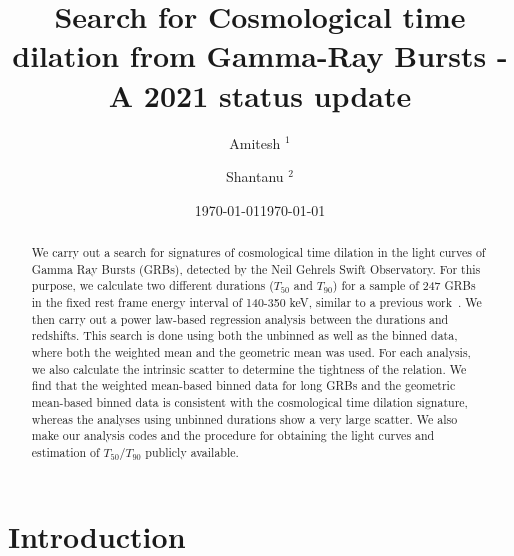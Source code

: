 \documentclass[prd,nofootinbib,preprintnumbers,floatfix]{revtex4}  %
\begin{document}
\renewcommand{\arraystretch}{2.2}



\title{Search for Cosmological time dilation from Gamma-Ray Bursts - A 2021 status update}%


\author{Amitesh  $^{1}$}%

 
\author{Shantanu $^{2}$ }%



\date{\today}


\date{\today}

\begin{abstract}
We carry out a search for signatures of  cosmological time dilation in the light curves  of Gamma Ray Bursts (GRBs), detected by the  Neil Gehrels Swift Observatory. For this purpose, we calculate two different durations ($T_{50}$ and $T_{90}$) for a sample of 
247 GRBs in the  fixed rest frame energy interval of 140-350 keV, similar to a previous work~\cite{zhang2013cosmological}. We then carry out a power law-based regression analysis   between the durations and redshifts. This search  is done using both the unbinned  as well as the  binned data, where both the weighted mean and the geometric mean was used.
For each analysis, we also  calculate the intrinsic scatter to determine the tightness  of the relation. We  find that the weighted mean-based  binned data for long GRBs and the geometric mean-based binned data  is consistent with the cosmological time dilation signature, whereas  the analyses using unbinned durations show a very large scatter. We  also make our analysis codes and the procedure for obtaining the light curves and estimation of $T_{50}$/$T_{90}$ publicly available.
\end{abstract}

\maketitle



\section{Introduction}
\end{document}
